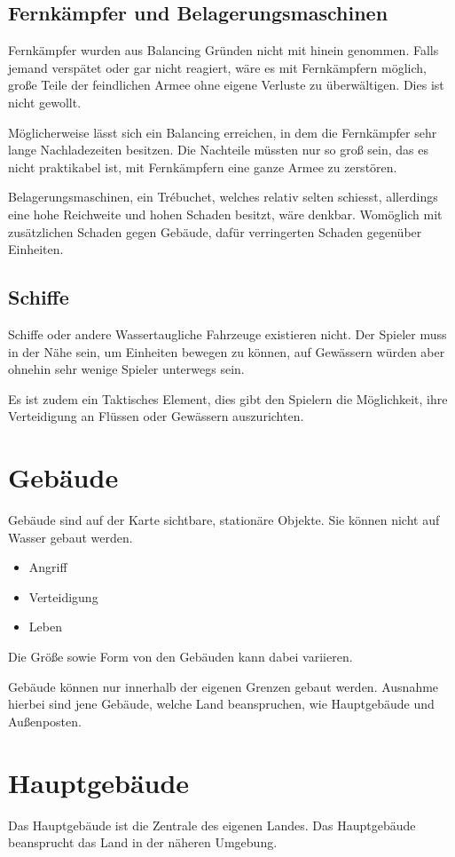 \subsection{Fernkämpfer und Belagerungsmaschinen}
Fernkämpfer wurden aus Balancing Gründen nicht mit hinein genommen. Falls jemand verspätet oder gar nicht reagiert, wäre es mit Fernkämpfern möglich, große Teile der feindlichen Armee ohne eigene Verluste zu überwältigen. Dies ist nicht gewollt. 

Möglicherweise lässt sich ein Balancing erreichen, in dem die Fernkämpfer sehr lange Nachladezeiten besitzen. Die Nachteile müssten nur so groß sein, das es nicht praktikabel ist, mit Fernkämpfern eine ganze Armee zu zerstören.

Belagerungsmaschinen, ein Trébuchet, welches relativ selten schiesst, allerdings eine hohe Reichweite und hohen Schaden besitzt, wäre denkbar. Womöglich mit zusätzlichen Schaden gegen Gebäude, dafür verringerten Schaden gegenüber Einheiten.


\subsection{Schiffe}
Schiffe oder andere Wassertaugliche Fahrzeuge existieren nicht. Der Spieler muss in der Nähe sein, um Einheiten bewegen zu können, auf Gewässern würden aber ohnehin sehr wenige Spieler unterwegs sein.

Es ist zudem ein Taktisches Element, dies gibt den Spielern die Möglichkeit, ihre Verteidigung an Flüssen oder Gewässern auszurichten.



\section{Gebäude}
Gebäude sind auf der Karte sichtbare, stationäre Objekte. Sie können nicht auf Wasser gebaut werden.
\begin{itemize}
\item Angriff 
\item Verteidigung
\item Leben
\end{itemize}

Die Größe sowie Form von den Gebäuden kann dabei variieren.

Gebäude können nur innerhalb der eigenen Grenzen gebaut werden. Ausnahme hierbei sind jene Gebäude, welche Land beanspruchen, wie Hauptgebäude und Außenposten.


\section{Hauptgebäude}
Das Hauptgebäude ist die Zentrale des eigenen Landes. Das Hauptgebäude beansprucht das Land in der näheren Umgebung. 

